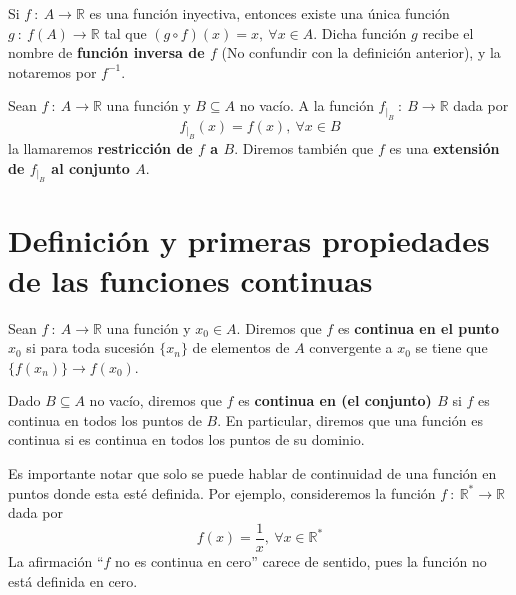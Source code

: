 \begin{definicion}
    Si $f ~:~ A \longrightarrow \mathbb{R}$ es una función inyectiva, entonces existe una única función
    $g ~:~ f(A) \longrightarrow \mathbb{R}$ tal que $(g \circ f)(x)=x, ~ \forall x \in A$.
    Dicha función $g$ recibe el nombre de \textbf{función inversa de $f$} (No confundir con la definición anterior),
    y la notaremos por $f^{-1}$.
\end{definicion}

\begin{definicion}
    Sean $f ~:~ A \longrightarrow \mathbb{R}$ una función y $B \subseteq A$ no vacío. A la función
    $f_{|_B} ~:~ B \longrightarrow \mathbb{R}$ dada por
    \begin{equation*}
        f_{|_B} (x) = f(x), ~ \forall x \in B
    \end{equation*}
    la llamaremos \textbf{restricción de $f$ a $B$}. Diremos también que $f$ es una \textbf{extensión de $f_{|_B}$ al conjunto $A$}.
\end{definicion}


\section{Definición y primeras propiedades de las funciones continuas}

\begin{definicion}
    Sean $f ~:~ A \longrightarrow \mathbb{R}$ una función y $x_0 \in A$. Diremos que $f$ es \textbf{continua en el punto $x_0$} si para toda sucesión $\{x_n\}$ de elementos de $A$ convergente a $x_0$ se tiene que $\{f(x_n)\} \longrightarrow f(x_0)$.
\end{definicion}

\begin{definicion}
    Dado $B \subseteq A$ no vacío, diremos que $f$ es \textbf{continua en (el conjunto) $B$} si $f$ es continua en todos los puntos de $B$. En particular, diremos que una función es continua si es continua en todos los puntos de su dominio.
\end{definicion}

Es importante notar que solo se puede hablar de continuidad de una función en puntos donde esta esté definida. Por ejemplo, consideremos la función $f ~:~ \mathbb{R}^* \longrightarrow \mathbb{R}$ dada por
\begin{equation*}
    f(x) = \frac{1}{x}, ~ \forall x \in \mathbb{R}^*
\end{equation*}
La afirmación ``$f$ no es continua en cero'' carece de sentido, pues la función no está definida en cero.

